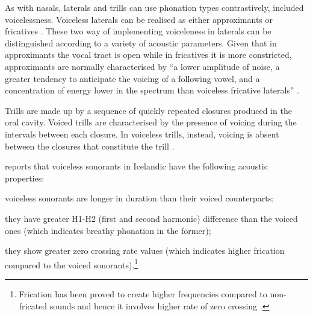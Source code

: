 \documentclass[11pt,a4paper,openany]{memoir}\usepackage[]{graphicx}\usepackage[]{color}
\begin{document}

As with nasals, laterals and trills can use phonation types contrastively, included voicelessness.
Voiceless laterals can be realised as either approximants or fricatives \citet{ladefoged1996}.
These two way of implementing voiceleness in laterals can be distinguished according to a variety of acoustic parameters.
Given that in approximants the vocal tract is open while in fricatives it is more constricted, approximants are normally characterised by ``a lower amplitude of noise, a greater tendency to anticipate the voicing of a following vowel, and a concentration of energy lower in the spectrum than voiceless fricative laterals'' \citep[198]{ladefoged1996}.

Trills are made up by a sequence of quickly repeated closures produced in the oral cavity.
Voiced trills are characterised by the presence of voicing during the intervals between each closure.
In voiceless trills, instead, voicing is absent between the closures that constitute the trill \citep[236]{ladefoged1996}.

\citet{bombien2006} reports that voiceless sonorants in Icelandic have the following acoustic properties: 
\begin{inparaenum}[(i)]
\item voiceless sonorants are longer in duration than their voiced counterparts;
\item they have greater H1-H2 (first and second harmonic) difference than the voiced ones (which indicates breathy phonation in the former);
\item they show greater zero crossing rate values (which indicates higher frication compared to the voiced sonorants).\footnote{Frication has been proved to create higher frequencies compared to non-fricated sounds and hence it involves higher rate of zero crossing \citep{weigelt1990}.}
\end{inparaenum}

\end{document}
